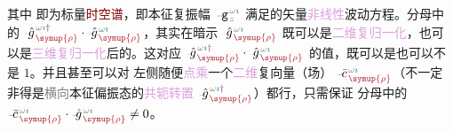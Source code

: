 其中  即为标量\textcolor{Maroon}{时空谱}，即\textcolor{PineGreen}{本征复振幅} $\xint{\begin{smallmatrix} ~ \\ {}^{}_{\mathcolor{gray}{-}} \\ ~ \end{smallmatrix}}{09}{\mathtt{g}}^{\;\!\mathcolor{gray}{\omega} \textcolor{PineGreen}{\imath}}_{\;\! \mathcolor{gray}{z}}$ 满足的矢量\textcolor{Plum}{非线性}波动方程。分母中的 $\xint{{}^{}_{\mathcolor{gray}{-}}}{10}{\hat{g}}^{\;\!\mathcolor{gray}{\omega} \textcolor{PineGreen}{\imath} \textcolor{Plum}{\dag}}_{\;\! \textcolor{Maroon}{\symup{\rho}}} \cdot \xint{{}^{}_{\mathcolor{gray}{-}}}{10}{\hat{g}}^{\;\!\mathcolor{gray}{\omega} \textcolor{PineGreen}{\imath}}_{\;\! \textcolor{Maroon}{\symup{\rho}}}$，其实在暗示 $\xint{{}^{}_{\mathcolor{gray}{-}}}{10}{\hat{g}}^{\;\!\mathcolor{gray}{\omega} \textcolor{PineGreen}{\imath}}_{\;\! \textcolor{Maroon}{\symup{\rho}}}$ 既可以是\textcolor{Plum}{二维复归一化}，也可以是\textcolor{Plum}{三维复归一化}后的。这对应 $\xint{{}^{}_{\mathcolor{gray}{-}}}{10}{\hat{g}}^{\;\!\mathcolor{gray}{\omega} \textcolor{PineGreen}{\imath} \textcolor{Plum}{\dag}}_{\;\! \textcolor{Maroon}{\symup{\rho}}} \cdot \xint{{}^{}_{\mathcolor{gray}{-}}}{10}{\hat{g}}^{\;\!\mathcolor{gray}{\omega} \textcolor{PineGreen}{\imath}}_{\;\! \textcolor{Maroon}{\symup{\rho}}}$ 的值，既可以是也可以不是 $1$。并且甚至可以对  左侧随便\textcolor{Plum}{点乘}一个\textcolor{Plum}{二维}复向量（场） $\xint{{}^{}_{\mathcolor{gray}{-}}}{04}{\bar{c}}^{\;\!\mathcolor{gray}{\omega} \textcolor{PineGreen}{\imath}}_{\;\! \textcolor{Maroon}{\symup{\rho}}}$（不一定非得是\textcolor{gray}{横向}\textcolor{PineGreen}{本征偏振态}的\textcolor{Plum}{共轭转置} $\xint{{}^{}_{\mathcolor{gray}{-}}}{10}{\hat{g}}^{\;\!\mathcolor{gray}{\omega} \textcolor{PineGreen}{\imath} \textcolor{Plum}{\dag}}_{\;\! \textcolor{Maroon}{\symup{\rho}}}$）都行，只需保证  分母中的 $\xint{{}^{}_{\mathcolor{gray}{-}}}{04}{\bar{c}}^{\;\!\mathcolor{gray}{\omega} \textcolor{PineGreen}{\imath}}_{\;\! \textcolor{Maroon}{\symup{\rho}}} \cdot \xint{{}^{}_{\mathcolor{gray}{-}}}{10}{\hat{g}}^{\;\!\mathcolor{gray}{\omega} \textcolor{PineGreen}{\imath}}_{\;\! \textcolor{Maroon}{\symup{\rho}}} \neq 0$。

